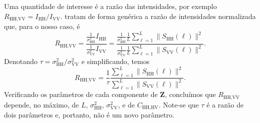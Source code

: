 \documentclass[12pt]{article}
\begin{document}
Uma quantidade de interesse é a razão das intensidades, por exemplo $R_{\text{HH,VV}} = I_{\text{HH}} / I_{\text{VV}}$.
\citet{lee} tratam de forma genérica a razão de intensidades normalizada que, para o nosso caso, é
$$
R_{\text{HH,VV}} = \frac{\frac1{\sigma_{\text{HH}}^2}I_{\text{HH}}}
						{\frac1{\sigma_{\text{VV}}^2}I_{\text{VV}}} = 
	\frac{\frac1{\sigma_{\text{HH}}^2} \frac1L \sum_{\ell=1}^{L}\|S_{\text{HH}}(\ell)\|^2}
	{\frac1{\sigma_{\text{VV}}^2} \frac1L \sum_{\ell=1}^{L}\|S_{\text{VV}}(\ell)\|^2}.
$$
Denotando $\tau = \sigma_{\text{HH}}^2 / \sigma_{\text{VV}}^2$ e simplificando, temos
$$
R_{\text{HH,VV}} = \frac{1}{\tau}
\frac{\sum_{\ell=1}^{L}\|S_{\text{HH}}(\ell)\|^2}
{\sum_{\ell=1}^{L}\|S_{\text{VV}}(\ell)\|^2}.
$$
Verificando os parâmetros de cada componente de $\bm Z$, concluímos que $R_{\text{HH,VV}}$ depende, no máximo, de $L$, $\sigma_{\text{HH}}^2$, $\sigma_{\text{VV}}^2$, e de $C_{\text{HH,HV}}$.
Note-se que $\tau$ é a razão de dois parâmetros e, portanto, não é um novo parâmetro.





\end{document}
